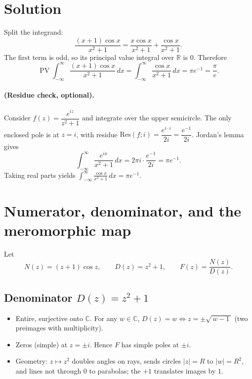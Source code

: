 \documentclass[12pt,a4paper]{article}
\newcommand{\C}{\mathbb{C}}
\begin{document}
\section*{Solution}
Split the integrand:
\[
\frac{(x+1)\cos x}{x^{2}+1}
=\frac{x\cos x}{x^{2}+1}+\frac{\cos x}{x^{2}+1}.
\]
The first term is odd, so its principal value integral over $\mathbb R$ is $0$.
Therefore
\[
\operatorname{PV}\!\int_{-\infty}^{\infty}\frac{(x+1)\cos x}{x^{2}+1}\,dx
=\int_{-\infty}^{\infty}\frac{\cos x}{x^{2}+1}\,dx
=\pi e^{-1}
=\frac{\pi}{e}.
\]

\paragraph{(Residue check, optional).}
Consider $f(z)=\dfrac{e^{iz}}{z^{2}+1}$ and integrate over the upper semicircle.
The only enclosed pole is at $z=i$, with residue $\mathrm{Res}(f;i)=\dfrac{e^{i\cdot i}}{2i}
=\dfrac{e^{-1}}{2i}$. Jordan’s lemma gives
\[
\int_{-\infty}^{\infty}\frac{e^{ix}}{x^{2}+1}\,dx=2\pi i\cdot\frac{e^{-1}}{2i}=\pi e^{-1}.
\]
Taking real parts yields $\displaystyle \int_{-\infty}^{\infty}\frac{\cos x}{x^{2}+1}\,dx=\pi e^{-1}$.

\section*{Numerator, denominator, and the meromorphic map}

Let
\[
N(z)=(z+1)\cos z,\qquad D(z)=z^{2}+1,\qquad F(z)=\frac{N(z)}{D(z)}.
\]

\subsection*{Denominator \(D(z)=z^{2}+1\)}
\begin{itemize}
	\item Entire, surjective onto \(\C\). For any \(w\in\C\), \(D(z)=w \iff z=\pm\sqrt{\,w-1\,}\) (two preimages with multiplicity).
	\item Zeros (simple) at \(z=\pm i\). Hence \(F\) has simple poles at \(\pm i\).
	\item Geometry: \(z\mapsto z^{2}\) doubles angles on rays, sends circles \(|z|=R\) to \(|w|=R^{2}\), and lines not through \(0\) to parabolas; the \(+1\) translates images by \(1\).
\end{itemize}
\end{document}

